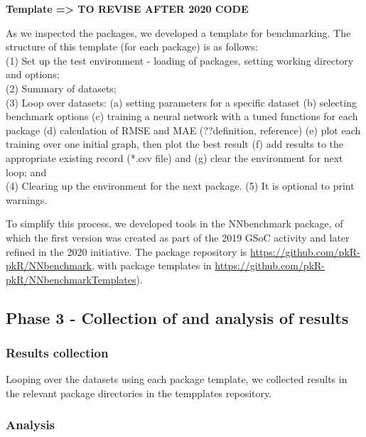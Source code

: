 \textbf{Template =\textgreater{} TO REVISE AFTER 2020 CODE}

As we inspected the packages, we developed a template for benchmarking.
The structure of this template (for each package) is as follows:\\
(1) Set up the test environment - loading of packages, setting working
directory and options;\\
(2) Summary of datasets;\\
(3) Loop over datasets: (a) setting parameters for a specific dataset
(b) selecting benchmark options (c) training a neural network with a
tuned functions for each package (d) calculation of RMSE and MAE
(??definition, reference) (e) plot each training over one initial graph,
then plot the best result (f) add results to the appropriate existing
record (*.csv file) and (g) clear the environment for next loop; and\\
(4) Clearing up the environment for the next package. (5) It is optional
to print warnings.

To simplify this process, we developed tools in the NNbenchmark package,
of which the first version was created as part of the 2019 GSoC activity
and later refined in the 2020 initiative. The package repository is
\url{https://github.com/pkR-pkR/NNbenchmark}, with package templates in
\url{https://github.com/pkR-pkR/NNbenchmarkTemplates}).

\hypertarget{phase-3---collection-of-and-analysis-of-results}{%
\subsection{Phase 3 - Collection of and analysis of
results}\label{phase-3---collection-of-and-analysis-of-results}}

\hypertarget{results-collection}{%
\subsubsection{Results collection}\label{results-collection}}

Looping over the datasets using each package template, we collected
results in the relevant package directories in the tempplates
repository.

\hypertarget{analysis}{%
\subsubsection{Analysis}\label{analysis}}

